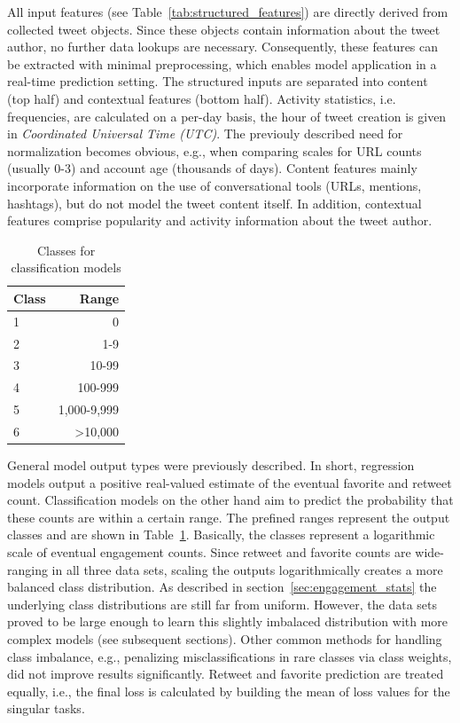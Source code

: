 All input features (see Table~\ref{tab:structured_features}) are directly derived
from collected tweet objects.
Since these objects contain information about the tweet author, no further data lookups
are necessary.
Consequently, these features can be extracted with minimal preprocessing, which
enables model application in a real-time prediction setting.
The structured inputs are separated into content (top half) and contextual
features (bottom half).
Activity statistics, i.e. frequencies, are calculated on a per-day basis,
the hour of tweet creation is given in \textit{Coordinated Universal Time (UTC)}.
The previouly described need for normalization becomes obvious, e.g., when
comparing scales for URL counts (usually 0-3) and account age (thousands of days).
Content features mainly incorporate information on the use of conversational
tools (URLs, mentions, hashtags), but do not model the tweet content itself.
In addition, contextual features comprise popularity and activity information
about the tweet author.

\begin{table}
\centering
  \begin{tabular}{lr}
    \toprule
    Class & Range \\
    \midrule
    1 & 0 \\
    2 & 1-9 \\
    3 & 10-99 \\
    4 & 100-999 \\
    5 & 1,000-9,999 \\
    6 & >10,000 \\
    \bottomrule
  \end{tabular}
  \caption{Classes for classification models}
  \label{tab:classification_buckets}
\end{table}

General model output types were previously described.
In short, regression models output a positive real-valued estimate of the
eventual favorite and retweet count.
Classification models on the other hand aim to predict the probability that
these counts are within a certain range.
The prefined ranges represent the output classes and are shown in Table~\ref{tab:classification_buckets}.
Basically, the classes represent a logarithmic scale of eventual engagement counts.
Since retweet and favorite counts are wide-ranging in all three data sets,
scaling the outputs logarithmically creates a more balanced class distribution.
As described in section~\ref{sec:engagement_stats} the underlying class distributions
are still far from uniform.
However, the data sets proved to be large enough to learn this slightly 
imbalaced distribution with more complex models (see subsequent sections).
Other common methods for handling class imbalance, e.g., penalizing misclassifications
in rare classes via class weights, did not improve results significantly.
Retweet and favorite prediction are treated equally, i.e., the final loss
is calculated by building the mean of loss values for the singular tasks.

